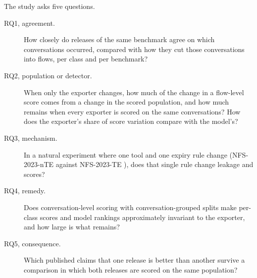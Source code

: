 \documentclass[pdflatex,sn-mathphys-num]{sn-jnl}
\theoremstyle{thmstyleone}%
\theoremstyle{thmstylethree}%
\begin{document}
The study asks five questions.
\begin{description}
\item[RQ1, agreement.] How closely do releases of the same benchmark agree on which conversations occurred, compared with how they cut those conversations into flows, per class and per benchmark?
\item[RQ2, population or detector.] When only the exporter changes, how much of the change in a flow-level score comes from a change in the scored population, and how much remains when every exporter is scored on the same conversations? How does the exporter's share of score variation compare with the model's?
\item[RQ3, mechanism.] In a natural experiment where one tool and one expiry rule change (NFS-2023-nTE against NFS-2023-TE \cite{pekar2024}), does that single rule change leakage and scores?
\item[RQ4, remedy.] Does conversation-level scoring with conversation-grouped splits make per-class scores and model rankings approximately invariant to the exporter, and how large is what remains?
\item[RQ5, consequence.] Which published claims that one release is better than another survive a comparison in which both releases are scored on the same population?
\end{description}
\end{document}
